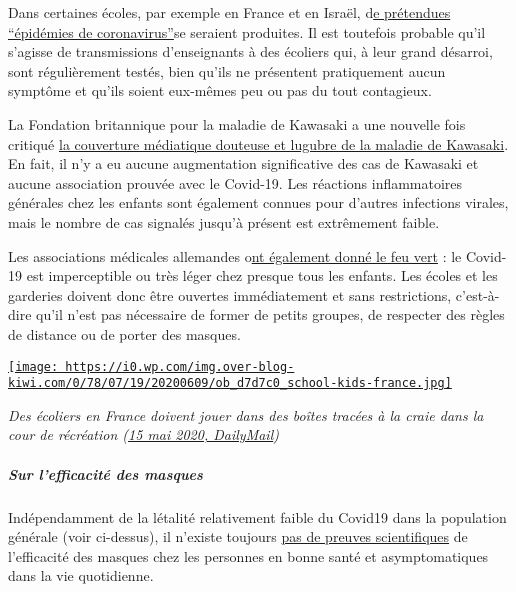 Dans certaines écoles, par exemple en France et en Israël,
d\href{https://www.npr.org/sections/coronavirus-live-updates/2020/06/03/868507524/israel-orders-schools-to-close-when-covid-19-cases-are-discovered}{e
prétendues ``épidémies de coronavirus''}se seraient produites. Il est
toutefois probable qu'il s'agisse de transmissions d'enseignants à des
écoliers qui, à leur grand désarroi, sont régulièrement testés, bien
qu'ils ne présentent pratiquement aucun symptôme et qu'ils soient
eux-mêmes peu ou pas du tout contagieux.

La Fondation britannique pour la maladie de Kawasaki a une nouvelle fois
critiqué
\href{https://www.societi.org.uk/kawasaki-disease-and-covid-19/}{la
couverture médiatique douteuse et lugubre de la maladie de Kawasaki}. En
fait, il n'y a eu aucune augmentation significative des cas de Kawasaki
et aucune association prouvée avec le Covid-19. Les réactions
inflammatoires générales chez les enfants sont également connues pour
d'autres infections virales, mais le nombre de cas signalés jusqu'à
présent est extrêmement faible.

Les associations médicales allemandes
o\href{https://www.welt.de/politik/deutschland/article208075525/Corona-Kitas-und-Grundschulen-vollstaendig-oeffnen-uneingeschraenkt.html}{nt
également donné le feu vert} : le Covid-19 est imperceptible ou très
léger chez presque tous les enfants. Les écoles et les garderies doivent
donc être ouvertes immédiatement et sans restrictions, c'est-à-dire
qu'il n'est pas nécessaire de former de petits groupes, de respecter des
règles de distance ou de porter des masques.

\href{http://img.over-blog-kiwi.com/0/78/07/19/20200609/ob_d7d7c0_school-kids-france.jpg\#width=800\&height=533}{\texttt{[image: https://i0.wp.com/img.over-blog-kiwi.com/0/78/07/19/20200609/ob\_d7d7c0\_school-kids-france.jpg]}}

\emph{Des écoliers en France doivent jouer dans des boîtes tracées à la
craie dans la cour de récréation
(\href{https://www.dailymail.co.uk/news/article-8314697/Heart-breaking-photo-children-forced-play-isolation-zones-sparks-outcry-France.html}{15
mai 2020, DailyMail})}

\hypertarget{sur-lefficacituxe9-des-masques}{%
\subparagraph{\texorpdfstring{\textbf{Sur l'efficacité des
masques}}{Sur l'efficacité des masques}}\label{sur-lefficacituxe9-des-masques}}

Indépendamment de la létalité relativement faible du Covid19 dans la
population générale (voir ci-dessus), il n'existe toujours
\href{https://off-guardian.org/2020/06/06/coronavirus-fact-check-6-does-wearing-a-mask-do-anything/}{pas
de preuves scientifiques} de l'efficacité des masques chez les personnes
en bonne santé et asymptomatiques dans la vie quotidienne.

